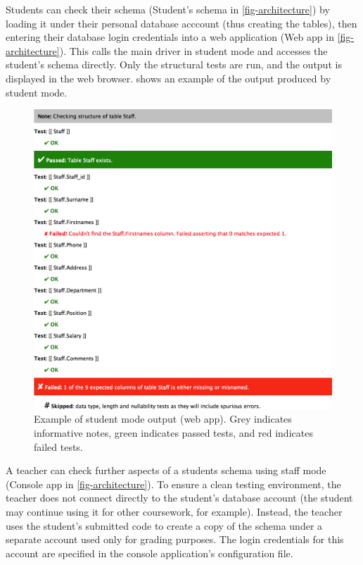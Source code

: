 \documentclass[sigconf, authordraft, capitalise]{acmart}
\begin{document}


Students can check their schema (\textsf{Student's schema} in \cref{fig-architecture}) by loading it under their personal database acccount (thus creating the tables), then entering their database login credentials into a web application (\textsf{Web app} in \cref{fig-architecture}). This calls the main driver in student mode and accesses the student's schema directly. Only the structural tests are run, and the output is displayed in the web browser.  shows an example of the output produced by student mode.


\begin{figure}
    \includegraphics[width=0.95\columnwidth,keepaspectratio]{images/web_output.png}
    \caption{Example of student mode output (web app). Grey indicates informative notes, green indicates passed tests, and red indicates failed tests.}
    \label{fig-student-output}
\end{figure}



A teacher can check further aspects of a students schema using staff mode (\textsf{Console app} in \cref{fig-architecture}). To ensure a clean testing environment, the teacher does not connect directly to the student's database account (the student may continue using it for other coursework, for example). Instead, the teacher uses the student's submitted code to create a copy of the schema under a separate account used only for grading purposes. The login credentials for this account are specified in the console application's configuration file.
\end{document}
